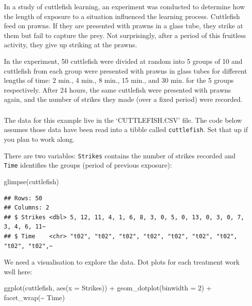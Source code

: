 \documentclass[
]{book}
\newenvironment{Shaded}{\begin{snugshade}}{\end{snugshade}}
\newcommand{\AttributeTok}[1]{\textcolor[rgb]{0.77,0.63,0.00}{#1}}
\newcommand{\DecValTok}[1]{\textcolor[rgb]{0.00,0.00,0.81}{#1}}
\newcommand{\FunctionTok}[1]{\textcolor[rgb]{0.00,0.00,0.00}{#1}}
\newcommand{\NormalTok}[1]{#1}
\newcommand{\SpecialCharTok}[1]{\textcolor[rgb]{0.00,0.00,0.00}{#1}}
\newenvironment{greybox}{
  \definecolor{shadecolor}{rgb}{0.95,0.95,0.95}  %
  \color{black}
  \begin{shaded}}
 {\end{shaded}}
\newenvironment{infobox}[1]
  {
  \begin{itemize}
  \renewcommand{\labelitemi}{
    \raisebox{-.7\height}[0pt][0pt]{
      {\setkeys{Gin}{width=3em,keepaspectratio}
        \texttt{[image: images/\#1]}}
    }
  }
  \setlength{\fboxsep}{1em}
  \begin{greybox}
  \item
  }
  {
  \end{greybox}
  \end{itemize}
  }
\begin{document}
In a study of cuttlefish learning, an experiment was conducted to determine how the length of exposure to a situation influenced the learning process. Cuttlefish feed on prawns. If they are presented with prawns in a glass tube, they strike at them but fail to capture the prey. Not surprisingly, after a period of this fruitless activity, they give up striking at the prawns.

In the experiment, 50 cuttlefish were divided at random into 5 groups of 10 and cuttlefish from each group were presented with prawns in glass tubes for different lengths of time: 2 min., 4 min., 8 min., 15 min., and 30 min. for the 5 groups respectively. After 24 hours, the same cuttlefish were presented with prawns again, and the number of strikes they made (over a fixed period) were recorded.

\begin{infobox}{action}

\hypertarget{section-22}{%
\subsubsection*{}\label{section-22}}

The data for this example live in the `CUTTLEFISH.CSV' file. The code below assumes those data have been read into a tibble called \texttt{cuttlefish}. Set that up if you plan to work along.

\end{infobox}

There are two variables: \texttt{Strikes} contains the number of strikes recorded and \texttt{Time} identifies the groups (period of previous exposure):

\begin{Shaded}
\begin{Highlighting}[]
\FunctionTok{glimpse}\NormalTok{(cuttlefish)}
\end{Highlighting}
\end{Shaded}

\begin{verbatim}
## Rows: 50
## Columns: 2
## $ Strikes <dbl> 5, 12, 11, 4, 1, 6, 8, 3, 0, 5, 0, 13, 0, 3, 0, 7, 3, 4, 6, 11~
## $ Time    <chr> "t02", "t02", "t02", "t02", "t02", "t02", "t02", "t02", "t02",~
\end{verbatim}

We need a visualisation to explore the data. Dot plots for each treatment work well here:

\begin{Shaded}
\begin{Highlighting}[]
\FunctionTok{ggplot}\NormalTok{(cuttlefish, }\FunctionTok{aes}\NormalTok{(}\AttributeTok{x =}\NormalTok{ Strikes)) }\SpecialCharTok{+} 
  \FunctionTok{geom\_dotplot}\NormalTok{(}\AttributeTok{binwidth =} \DecValTok{2}\NormalTok{) }\SpecialCharTok{+} \FunctionTok{facet\_wrap}\NormalTok{(}\SpecialCharTok{\textasciitilde{}}\NormalTok{ Time)}
\end{Highlighting}
\end{Shaded}
\end{document}
